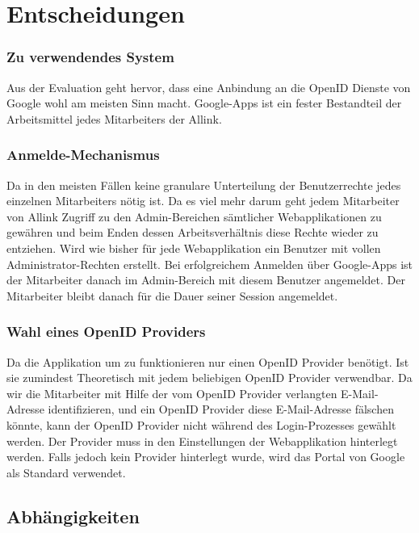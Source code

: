 \section{Entscheidungen}
\label{sec:Entscheidungen}
\subsubsection{Zu verwendendes System}
\label{ssub:Zu verwendendes System}
Aus der Evaluation geht hervor, dass eine Anbindung an die OpenID Dienste von
Google wohl am meisten Sinn macht. Google-Apps ist ein fester Bestandteil der
Arbeitsmittel jedes Mitarbeiters der Allink.

\subsubsection{Anmelde-Mechanismus}
\label{ssub:Anmelde-Mechanismus}
Da in den meisten Fällen keine granulare Unterteilung der Benutzerrechte jedes
einzelnen Mitarbeiters nötig ist. Da es viel mehr darum geht jedem Mitarbeiter
von Allink Zugriff zu den Admin-Bereichen sämtlicher Webapplikationen zu
gewähren und beim Enden dessen Arbeitsverhältnis diese Rechte wieder zu
entziehen. Wird wie bisher für jede Webapplikation ein Benutzer mit vollen
Administrator-Rechten erstellt. Bei erfolgreichem Anmelden über Google-Apps ist
der Mitarbeiter danach im Admin-Bereich mit diesem Benutzer angemeldet. Der
Mitarbeiter bleibt danach für die Dauer seiner Session angemeldet.

\subsubsection{Wahl eines OpenID Providers}
\label{ssub:Wahl eines OpenID Providers}
Da die Applikation um zu funktionieren nur einen OpenID Provider benötigt. Ist
sie zumindest Theoretisch mit jedem beliebigen OpenID Provider verwendbar. Da
wir die Mitarbeiter mit Hilfe der vom OpenID Provider verlangten E-Mail-Adresse
identifizieren, und ein OpenID Provider diese E-Mail-Adresse fälschen könnte,
kann der OpenID Provider nicht während des Login-Prozesses gewählt werden. Der
Provider muss in den Einstellungen der Webapplikation hinterlegt werden. Falls
jedoch kein Provider hinterlegt wurde, wird das Portal von Google als Standard
verwendet.

\subsection{Abhängigkeiten}
\label{sub:Abhängigkeiten}

